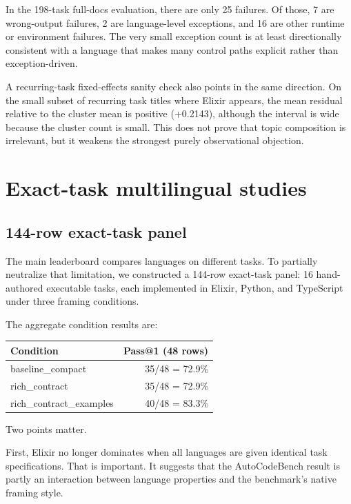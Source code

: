 \documentclass[11pt]{article}
\makeatletter
\newcommand{\acb}{AutoCodeBench}
\newcommand{\passatone}{Pass@1}
\newcommand{\elixir}{Elixir}
\newcommand{\pythonlang}{Python}
\newcommand{\tslang}{TypeScript}
\makeatother
\begin{document}
In the 198-task full-docs evaluation, there are only 25 failures. Of those, 7 are wrong-output failures, 2 are language-level exceptions, and 16 are other runtime or environment failures. The very small exception count is at least directionally consistent with a language that makes many control paths explicit rather than exception-driven.

A recurring-task fixed-effects sanity check also points in the same direction. On the small subset of recurring task titles where \elixir{} appears, the mean residual relative to the cluster mean is positive (+0.2143), although the interval is wide because the cluster count is small. This does not prove that topic composition is irrelevant, but it weakens the strongest purely observational objection.

\section{Exact-task multilingual studies}

\subsection{144-row exact-task panel}

The main leaderboard compares languages on different tasks. To partially neutralize that limitation, we constructed a 144-row exact-task panel: 16 hand-authored executable tasks, each implemented in \elixir{}, \pythonlang{}, and \tslang{} under three framing conditions.

The aggregate condition results are:
\begin{center}
\begin{tabular}{lr}
\toprule
Condition & \passatone{} (48 rows) \\
\midrule
baseline\_compact & 35/48 = 72.9\% \\
rich\_contract & 35/48 = 72.9\% \\
rich\_contract\_examples & 40/48 = 83.3\% \\
\bottomrule
\end{tabular}
\end{center}

Two points matter.

First, \elixir{} no longer dominates when all languages are given identical task specifications. That is important. It suggests that the \acb{} result is partly an interaction between language properties and the benchmark's native framing style.
\end{document}
